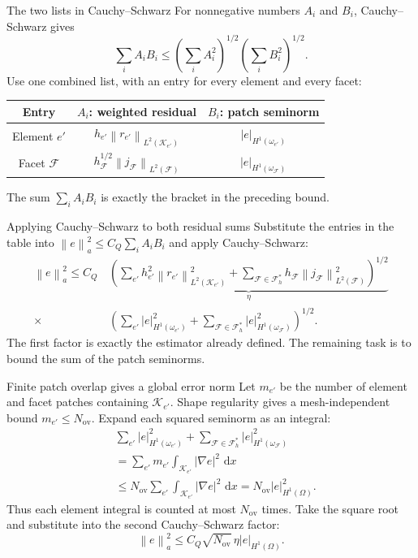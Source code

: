\documentclass[11pt,aspectratio=169]{beamer}
\newcommand{\dd}{\,\mathrm{d}}
\newcommand{\Om}{\Omega}
\newcommand{\Fh}{\mathcal F_h}
\newcommand{\norm}[2][]{\left\lVert#2\right\rVert_{#1}}
\newcommand{\seminorm}[2][]{\left\lvert#2\right\rvert_{#1}}
\newcommand{\grad}{\nabla}
\begin{document}
\begin{frame}{The two lists in Cauchy--Schwarz}
For nonnegative numbers $A_i$ and $B_i$, Cauchy--Schwarz gives
\[
 \sum_i A_iB_i\leq
 \left(\sum_i A_i^2\right)^{1/2}
 \left(\sum_i B_i^2\right)^{1/2}.
\]
Use one combined list, with an entry for every element and every facet:
\begin{center}
\renewcommand{\arraystretch}{1.8}
\begin{tabular}{ccc}
\toprule
Entry & $A_i$: weighted residual & $B_i$: patch seminorm\\
\midrule
Element $e'$ & $h_{e'}\norm[L^2(\mathcal K_{e'})]{r_{e'}}$
 & $\seminorm[H^1(\omega_{e'})]{e}$\\
Facet $\mathcal F$ & $h_{\mathcal F}^{1/2}\norm[L^2(\mathcal F)]{j_{\mathcal F}}$
 & $\seminorm[H^1(\omega_{\mathcal F})]{e}$\\
\bottomrule
\end{tabular}
\end{center}
The sum $\sum_i A_iB_i$ is exactly the bracket in the preceding bound.
\end{frame}

\begin{frame}{Applying Cauchy--Schwarz to both residual sums}
Substitute the entries in the table into
$\norm[a]{e}^2\leq C_Q\sum_i A_iB_i$ and apply Cauchy--Schwarz:
\[
\begin{aligned}
 \norm[a]{e}^2\leq C_Q\,
 &\underbrace{\left(
 \sum_{e'}h_{e'}^2\norm[L^2(\mathcal K_{e'})]{r_{e'}}^2
 +\sum_{\mathcal F\in\Fh^\ast}
 h_{\mathcal F}\norm[L^2(\mathcal F)]{j_{\mathcal F}}^2
 \right)^{1/2}}_{\eta}\\[3pt]
 {}\times{}&\left(\sum_{e'}\seminorm[H^1(\omega_{e'})]{e}^2
 +\sum_{\mathcal F\in\Fh^\ast}
  \seminorm[H^1(\omega_{\mathcal F})]{e}^2\right)^{1/2}.
\end{aligned}
\]
The first factor is exactly the estimator already defined. The remaining
task is to bound the sum of the patch seminorms.
\end{frame}

\begin{frame}{Finite patch overlap gives a global error norm}
Let $m_{e'}$ be the number of element and facet patches containing
$\mathcal K_{e'}$. Shape regularity gives a mesh-independent bound
$m_{e'}\leq N_{\mathrm{ov}}$. Expand each squared seminorm as an integral:
\[
\begin{aligned}
 &\sum_{e'}\seminorm[H^1(\omega_{e'})]{e}^2
  +\sum_{\mathcal F\in\Fh^\ast}
   \seminorm[H^1(\omega_{\mathcal F})]{e}^2\\
 &=\sum_{e'}m_{e'}\int_{\mathcal K_{e'}}|\grad e|^2\,\dd x\\
 &\leq N_{\mathrm{ov}}\sum_{e'}
                 \int_{\mathcal K_{e'}}|\grad e|^2\,\dd x
  =N_{\mathrm{ov}}\seminorm[H^1(\Om)]{e}^2.
\end{aligned}
\]
Thus each element integral is counted at most $N_{\mathrm{ov}}$ times.
Take the square root and substitute into the second Cauchy--Schwarz factor:
\[
  \norm[a]{e}^2
  \leq C_Q\sqrt{N_{\mathrm{ov}}}\,\eta
  \seminorm[H^1(\Om)]{e}.
\]
\end{frame}
\end{document}
